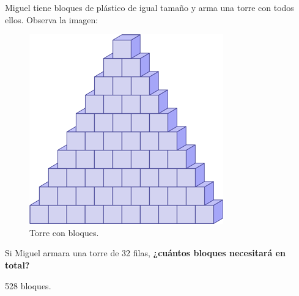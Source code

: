 Miguel tiene bloques de plástico de igual tamaño y arma una torre con todos ellos. Observa la imagen:

\begin{minipage}{0.4\linewidth}
    \begin{figure}[H]
        \centering
        \includegraphics[width=0.7\linewidth]{../images/22bc4d835622314209af99a305ea2515952e3902}
        \caption{Torre con bloques.}
        \label{fig:22bc4d835622314209af99a305ea2515952e3902}
    \end{figure}
\end{minipage}\hfill
\begin{minipage}{0.6\linewidth}
    Si Miguel armara una torre de 32 filas,
    \textbf{¿cuántos bloques necesitará en total?}
    \begin{solutionbox}{1.2cm}
        528 bloques.
    \end{solutionbox}
\end{minipage}
